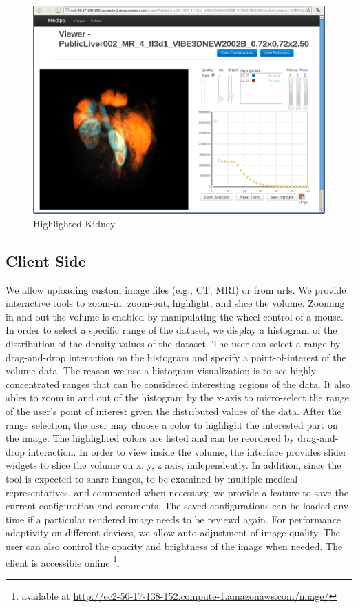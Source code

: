 \documentclass[annual]{acmsiggraph}
\begin{document}
\begin{figure}[htb]
\includegraphics[scale=0.475]{kidneys.png}
	\caption{\label{fig:head}Highlighted Kidney}
\end{figure}

\subsection{Client Side}
We allow uploading custom image files (e.g., CT, MRI) or from urls. We provide interactive tools to zoom-in, zoom-out, highlight, and slice the volume. Zooming in and out the volume is enabled by manipulating the wheel control of a mouse. In order to select a specific range of the dataset, we display a histogram of the distribution of the density values of the dataset. The user can select a range by drag-and-drop interaction on the histogram and specify a point-of-interest of the volume data. The reason we use a histogram visualization is to see highly concentrated ranges that can be considered interesting regions of the data. It also ables to zoom in and out of the histogram by the x-axis to micro-select the range of the user's point of interest given the distributed values of the data. After the range selection, the user may choose a color to highlight the interested part on the image. The highlighted colors are listed and can be reordered by drag-and-drop interaction. In order to view inside the volume, the interface provides slider widgets to slice the volume on x, y, z axis, independently. In addition, since the tool is expected to share images, to be examined by multiple medical representatives, and commented when necessary, we provide a feature to save the current configuration and comments. The saved configurations can be loaded any time if a particular rendered image needs to be reviewd again. For performance adaptivity on different devices, we allow auto adjustment of image quality. The user can also control the opacity and brightness of the image when needed. The client is accessible online \footnote{available at \url{http://ec2-50-17-138-152.compute-1.amazonaws.com/image/}}.
\end{document}
